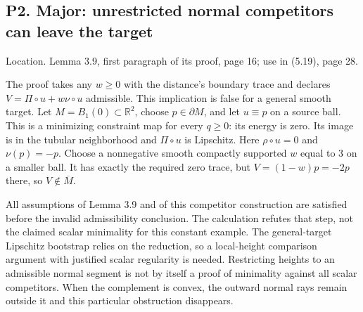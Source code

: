 \documentclass[10pt]{article}
\begin{document}
\subsection*{P2. Major: unrestricted normal competitors can leave the target}
Location. Lemma 3.9, first paragraph of its proof, page 16; use in (5.19), page 28.\par
The proof takes any \(w\ge0\) with the distance’s boundary trace and declares \(V=\Pi\circ u+w\nu\circ u\) admissible. This implication is false for a general smooth target. Let \(M=B_1(0)\subset\mathbb R^2\), choose \(p\in\partial M\), and let \(u\equiv p\) on a source ball. This is a minimizing constraint map for every \(q\ge0\): its energy is zero. Its image is in the tubular neighborhood and \(\Pi\circ u\) is Lipschitz. Here \(\rho\circ u=0\) and \(\nu(p)=-p\). Choose a nonnegative smooth compactly supported \(w\) equal to \(3\) on a smaller ball. It has exactly the required zero trace, but \(V=(1-w)p=-2p\) there, so \(V\notin\overline M\).\par
All assumptions of Lemma 3.9 and of this competitor construction are satisfied before the invalid admissibility conclusion. The calculation refutes that step, not the claimed scalar minimality for this constant example. The general-target Lipschitz bootstrap relies on the reduction, so a local-height comparison argument with justified scalar regularity is needed. Restricting heights to an admissible normal segment is not by itself a proof of minimality against all scalar competitors. When the complement is convex, the outward normal rays remain outside it and this particular obstruction disappears.\par
\end{document}
